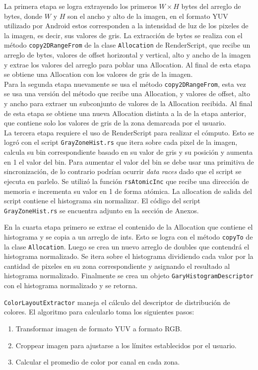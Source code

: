 La primera etapa se logra extrayendo los primeros $W\times H$ bytes del arreglo de bytes, donde $W$ y $H$ son el ancho y alto de la imagen, en el formato YUV utilizado por Android estos corresponden a la intensidad de luz de los pixeles de la imagen, es decir, sus valores de gris. La extracción de bytes se realiza con el método \texttt{copy2DRangeFrom} de la clase \texttt{Allocation} de RenderScript, que recibe un arreglo de bytes, valores de offset horizontal y vertical, alto y ancho de la imagen y extrae los valores del arreglo para poblar una Allocation. Al final de esta etapa se obtiene una Allocation con los valores de gris de la imagen. \\

Para la segunda etapa nuevamente se usa el método \texttt{copy2DRangeFrom}, esta vez se usa una versión del método que recibe una Allocation, y valores de offset, alto y ancho para extraer un subconjunto de valores de la Allocation recibida. Al final de esta etapa se obtiene una nueva Allocation distinta a la de la etapa anterior, que contiene solo los valores de gris de la zona demarcada por el usuario.\\

La tercera etapa requiere el uso de RenderScript para realizar el cómputo. Esto se logró con el script \texttt{GrayZoneHist.rs} que itera sobre cada pixel de la imagen, calcula su bin correspondiente basado en su valor de gris y su posición y aumenta en 1 el valor del bin. Para aumentar el valor del bin se debe usar una primitiva de sincronización, de lo contrario podrían ocurrir \emph{data races} dado que el script se ejecuta en parlelo. Se utilizó la función \texttt{rsAtomicInc} que recibe una dirección de memoria e incrementa su valor en 1 de forma atómica. La allocation de salida del script contiene el histograma sin normalizar. El código del script \texttt{GrayZoneHist.rs} se encuentra adjunto en la sección de Anexos.

En la cuarta etapa primero se extrae el contenido de la Allocation que contiene el histograma y se copia a un arreglo de ints. Esto se logra con el método \texttt{copyTo} de la clase \texttt{Allocation}. Luego se crea un nuevo arreglo de doubles que contendrá el histograma normalizado. Se itera sobre el histograma dividiendo cada valor por la cantidad de pixeles en su zona correspondiente y asignando el resultado al histograma normalizado. Finalmente se crea un objeto \texttt{GaryHistogramDescriptor} con el histograma normalizado y se retorna.

\texttt{ColorLayoutExtractor} maneja el cálculo del descriptor de distribución de colores. El algoritmo para calcularlo toma los siguientes pasos:
\begin{enumerate}
\item Transformar imagen de formato YUV a formato RGB.
\item Croppear imagen para ajustarse a los límites establecidos por el usuario.
\item Calcular el promedio de color por canal en cada zona.
\end{enumerate}

